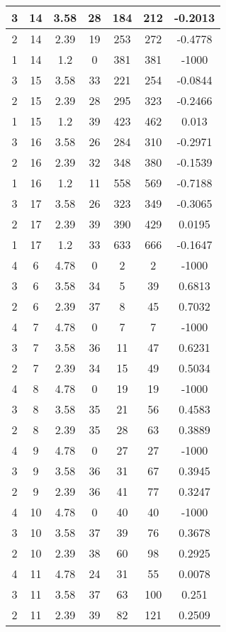 \documentclass[letterpaper, 12pt]{article}
\begin{document}
\begin{longtable}{|c|c|c|c|c|c|c|}
\hline
3 & 14 & 3.58 & 28 & 184 & 212 & -0.2013 \\
\hline
2 & 14 & 2.39 & 19 & 253 & 272 & -0.4778 \\
\hline
1 & 14 & 1.2 & 0 & 381 & 381 & -1000 \\
\hline
3 & 15 & 3.58 & 33 & 221 & 254 & -0.0844 \\
\hline
2 & 15 & 2.39 & 28 & 295 & 323 & -0.2466 \\
\hline
1 & 15 & 1.2 & 39 & 423 & 462 & 0.013 \\
\hline
3 & 16 & 3.58 & 26 & 284 & 310 & -0.2971 \\
\hline
2 & 16 & 2.39 & 32 & 348 & 380 & -0.1539 \\
\hline
1 & 16 & 1.2 & 11 & 558 & 569 & -0.7188 \\
\hline
3 & 17 & 3.58 & 26 & 323 & 349 & -0.3065 \\
\hline
2 & 17 & 2.39 & 39 & 390 & 429 & 0.0195 \\
\hline
1 & 17 & 1.2 & 33 & 633 & 666 & -0.1647 \\
\hline
4 & 6 & 4.78 & 0 & 2 & 2 & -1000 \\
\hline
3 & 6 & 3.58 & 34 & 5 & 39 & 0.6813 \\
\hline
2 & 6 & 2.39 & 37 & 8 & 45 & 0.7032 \\
\hline
4 & 7 & 4.78 & 0 & 7 & 7 & -1000 \\
\hline
3 & 7 & 3.58 & 36 & 11 & 47 & 0.6231 \\
\hline
2 & 7 & 2.39 & 34 & 15 & 49 & 0.5034 \\
\hline
4 & 8 & 4.78 & 0 & 19 & 19 & -1000 \\
\hline
3 & 8 & 3.58 & 35 & 21 & 56 & 0.4583 \\
\hline
2 & 8 & 2.39 & 35 & 28 & 63 & 0.3889 \\
\hline
4 & 9 & 4.78 & 0 & 27 & 27 & -1000 \\
\hline
3 & 9 & 3.58 & 36 & 31 & 67 & 0.3945 \\
\hline
2 & 9 & 2.39 & 36 & 41 & 77 & 0.3247 \\
\hline
4 & 10 & 4.78 & 0 & 40 & 40 & -1000 \\
\hline
3 & 10 & 3.58 & 37 & 39 & 76 & 0.3678 \\
\hline
2 & 10 & 2.39 & 38 & 60 & 98 & 0.2925 \\
\hline
4 & 11 & 4.78 & 24 & 31 & 55 & 0.0078 \\
\hline
3 & 11 & 3.58 & 37 & 63 & 100 & 0.251 \\
\hline
2 & 11 & 2.39 & 39 & 82 & 121 & 0.2509 \\

\end{longtable}
\end{document}
